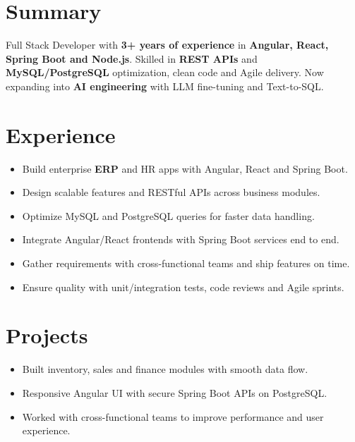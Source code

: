 \documentclass[11pt]{deedy-resume-openfont}
\renewcommand{\sectionsep}{\vspace{9pt}}
\begin{document}
\begin{minipage}[t]{0.66\textwidth}


\section{Summary}
Full Stack Developer with \textbf{3+ years of experience} in \textbf{Angular, React, Spring Boot and Node.js}. Skilled in \textbf{REST APIs} and \textbf{MySQL/PostgreSQL} optimization, clean code and Agile delivery. Now expanding into \textbf{AI engineering} with LLM fine-tuning and Text-to-SQL.
\sectionsep


\section{Experience}
\begin{itemize}
  \item Build enterprise \textbf{ERP} and HR apps with Angular, React and Spring Boot.
  \item Design scalable features and RESTful APIs across business modules.
  \item Optimize MySQL and PostgreSQL queries for faster data handling.
  \item Integrate Angular/React frontends with Spring Boot services end to end.
  \item Gather requirements with cross-functional teams and ship features on time.
  \item Ensure quality with unit/integration tests, code reviews and Agile sprints.
\end{itemize}
\sectionsep


\section{Projects}
\begin{itemize}
  \item Built inventory, sales and finance modules with smooth data flow.
  \item Responsive Angular UI with secure Spring Boot APIs on PostgreSQL.
  \item Worked with cross-functional teams to improve performance and user experience.
\end{itemize}
\sectionsep


\end{minipage}
\end{document}

